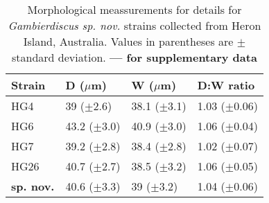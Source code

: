 \documentclass[12pt]{article}
\begin{document}
\FloatBarrier
\begin{table}
\caption{Morphological meassurements for details for \emph{Gambierdiscus sp. nov.} strains collected from Heron Island, Australia. Values in parentheses are $\pm$ standard deviation. \textbf{--- for supplementary data}}
\label{tbl:SizeTable}
\begin{tabular}{ | p{2cm} | p{2.5cm} | p{2.5cm} | p{2.5cm} | }
\hline
 \textbf{Strain} & \textbf{D ($\mu$m)} & \textbf{W ($\mu$m)}  & \textbf{D:W ratio}  \\
 \hline
 HG4  & 39 ($\pm$2.6) & 38.1 ($\pm$3.1) & 1.03 ($\pm$0.06) \\

 HG6  & 43.2 ($\pm$3.0) & 40.9 ($\pm$3.0) & 1.06 ($\pm$0.04)  \\

 HG7  & 39.2 ($\pm$2.8) & 38.4 ($\pm$2.8) & 1.02 ($\pm$0.07)  \\

 HG26  & 40.7 ($\pm$2.7) & 38.5 ($\pm$3.2) & 1.06 ($\pm$0.05) \\
  \hline
\textbf{sp. nov.}  & 40.6 ($\pm$3.3) & 39 ($\pm$3.2) & 1.04 ($\pm$0.06) \\
 \hline
\end{tabular}
\end{table}
\FloatBarrier
\end{document}
